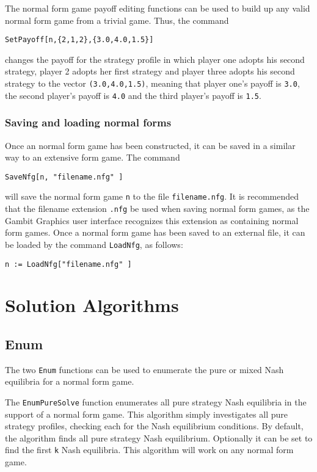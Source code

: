 The normal form game payoff editing functions can be used to build up any
valid normal form game from a trivial game.  Thus, the command

\begin{verbatim}
SetPayoff[n,{2,1,2},{3.0,4.0,1.5}]
\end{verbatim}

\noindent
changes the payoff for the strategy profile in which player one adopts
his second strategy, player 2 adopts her first strategy and player
three adopts his second strategy to the vector \verb+(3.0,4.0,1.5)+,
meaning that player one's payoff is \verb+3.0+, the second player's
payoff is \verb+4.0+ and the third player's payoff is \verb+1.5+.

\subsubsection{Saving and loading normal forms}

Once an normal form game has been constructed, it can be saved in a
similar way to an extensive form game.  The command 

\begin{verbatim}
SaveNfg[n, "filename.nfg" ]
\end{verbatim}

\noindent
will save the normal form game \verb+n+ to the file
\verb+filename.nfg+.  It is recommended that the filename extension
\verb+.nfg+ be used when saving normal form games, as the Gambit
Graphics user interface recognizes this extension as containing normal
form games.  Once a normal form game has been saved to an external
file, it can be loaded by the command \verb+LoadNfg+, as follows:

\begin{verbatim}
n := LoadNfg["filename.nfg" ]
\end{verbatim}

\section{Solution Algorithms}

\subsection{Enum}

The two {\tt Enum} functions can be used to enumerate the pure or
mixed Nash equilibria for a normal form game.

The {\tt EnumPureSolve} function enumerates all pure strategy Nash
equilibria in the support of a normal form game.  This algorithm
simply investigates all pure strategy profiles, checking each for the
Nash equilibrium conditions.  By default, the algorithm finds all pure
strategy Nash equilibrium.  Optionally it can be set to find the first
\verb+k+ Nash equilibria.  This algorithm will work on any normal form
game.

